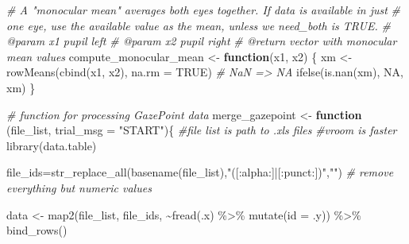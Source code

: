 \documentclass[
]{article}
\newenvironment{Shaded}{\begin{snugshade}}{\end{snugshade}}
\newcommand{\AttributeTok}[1]{\textcolor[rgb]{0.77,0.63,0.00}{#1}}
\newcommand{\CommentTok}[1]{\textcolor[rgb]{0.56,0.35,0.01}{\textit{#1}}}
\newcommand{\ConstantTok}[1]{\textcolor[rgb]{0.00,0.00,0.00}{#1}}
\newcommand{\ControlFlowTok}[1]{\textcolor[rgb]{0.13,0.29,0.53}{\textbf{#1}}}
\newcommand{\FunctionTok}[1]{\textcolor[rgb]{0.00,0.00,0.00}{#1}}
\newcommand{\NormalTok}[1]{#1}
\newcommand{\OtherTok}[1]{\textcolor[rgb]{0.56,0.35,0.01}{#1}}
\newcommand{\SpecialCharTok}[1]{\textcolor[rgb]{0.00,0.00,0.00}{#1}}
\newcommand{\StringTok}[1]{\textcolor[rgb]{0.31,0.60,0.02}{#1}}
\begin{document}
\begin{Shaded}
\begin{Highlighting}[]
\CommentTok{\# A "monocular mean" averages both eyes together. If data is available in just}
\CommentTok{\# one eye, use the available value as the mean, unless we need\_both is TRUE.}
\CommentTok{\#\textquotesingle{} @param x1 pupil left}
\CommentTok{\#\textquotesingle{} @param x2 pupil right}
\CommentTok{\#\textquotesingle{} @return vector with monocular mean values}
\NormalTok{compute\_monocular\_mean }\OtherTok{\textless{}{-}} \ControlFlowTok{function}\NormalTok{(x1, x2) \{}
\NormalTok{  xm }\OtherTok{\textless{}{-}} \FunctionTok{rowMeans}\NormalTok{(}\FunctionTok{cbind}\NormalTok{(x1, x2), }\AttributeTok{na.rm =} \ConstantTok{TRUE}\NormalTok{)}
  \CommentTok{\# NaN =\textgreater{} NA}
  \FunctionTok{ifelse}\NormalTok{(}\FunctionTok{is.nan}\NormalTok{(xm), }\ConstantTok{NA}\NormalTok{, xm)}
\NormalTok{\}}


\CommentTok{\# function for processing GazePoint data}
\NormalTok{merge\_gazepoint }\OtherTok{\textless{}{-}} \ControlFlowTok{function}\NormalTok{ (file\_list, }\AttributeTok{trial\_msg =} \StringTok{"START"}\NormalTok{)\{}
  \CommentTok{\#file list is path to .xls files}
  \CommentTok{\#vroom is faster}
  \FunctionTok{library}\NormalTok{(data.table)}
  
\NormalTok{  file\_ids}\OtherTok{=}\FunctionTok{str\_replace\_all}\NormalTok{(}\FunctionTok{basename}\NormalTok{(file\_list),}\StringTok{"([:alpha:]|[:punct:])"}\NormalTok{,}\StringTok{""}\NormalTok{) }\CommentTok{\# remove everything but numeric values}
                   
\NormalTok{  data }\OtherTok{\textless{}{-}} \FunctionTok{map2}\NormalTok{(file\_list, file\_ids, }\SpecialCharTok{\textasciitilde{}}\FunctionTok{fread}\NormalTok{(.x) }\SpecialCharTok{\%\textgreater{}\%} 
    \FunctionTok{mutate}\NormalTok{(}\AttributeTok{id =}\NormalTok{ .y))  }\SpecialCharTok{\%\textgreater{}\%} 
    \FunctionTok{bind\_rows}\NormalTok{()}


\end{Highlighting}
\end{Shaded}
\end{document}
